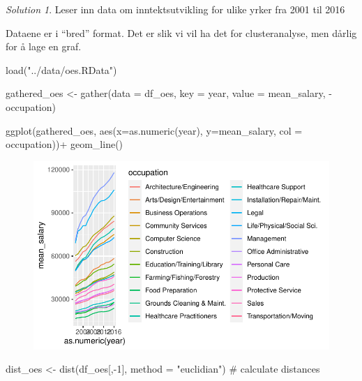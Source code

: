 \documentclass[
  letterpaper,
  DIV=11,
  numbers=noendperiod]{scrreprt}
\newenvironment{Shaded}{\begin{snugshade}}{\end{snugshade}}
\newcommand{\AttributeTok}[1]{\textcolor[rgb]{0.40,0.45,0.13}{#1}}
\newcommand{\CommentTok}[1]{\textcolor[rgb]{0.37,0.37,0.37}{#1}}
\newcommand{\DecValTok}[1]{\textcolor[rgb]{0.68,0.00,0.00}{#1}}
\newcommand{\FunctionTok}[1]{\textcolor[rgb]{0.28,0.35,0.67}{#1}}
\newcommand{\NormalTok}[1]{\textcolor[rgb]{0.00,0.23,0.31}{#1}}
\newcommand{\OtherTok}[1]{\textcolor[rgb]{0.00,0.23,0.31}{#1}}
\newcommand{\SpecialCharTok}[1]{\textcolor[rgb]{0.37,0.37,0.37}{#1}}
\newcommand{\StringTok}[1]{\textcolor[rgb]{0.13,0.47,0.30}{#1}}
\theoremstyle{definition}
\theoremstyle{remark}
\newtheorem*{solution}{Solution}
\begin{document}
\begin{solution}

Leser inn data om inntektsutvikling for ulike yrker fra 2001 til 2016

Dataene er i ``bred'' format. Det er slik vi vil ha det for
clusteranalyse, men dårlig for å lage en graf.

\begin{Shaded}
\begin{Highlighting}[]
\FunctionTok{load}\NormalTok{(}\StringTok{"../data/oes.RData"}\NormalTok{)}

\NormalTok{gathered\_oes }\OtherTok{\textless{}{-}} \FunctionTok{gather}\NormalTok{(}\AttributeTok{data =}\NormalTok{ df\_oes, }
                       \AttributeTok{key =}\NormalTok{ year, }
                       \AttributeTok{value =}\NormalTok{ mean\_salary, }
                       \SpecialCharTok{{-}}\NormalTok{occupation)}

\FunctionTok{ggplot}\NormalTok{(gathered\_oes, }\FunctionTok{aes}\NormalTok{(}\AttributeTok{x=}\FunctionTok{as.numeric}\NormalTok{(year), }\AttributeTok{y=}\NormalTok{mean\_salary, }\AttributeTok{col =}\NormalTok{ occupation))}\SpecialCharTok{+}
  \FunctionTok{geom\_line}\NormalTok{()}
\end{Highlighting}
\end{Shaded}

\begin{figure}[H]

{\centering \includegraphics{./unsupervised_files/figure-pdf/unnamed-chunk-2-1.pdf}

}

\end{figure}

\begin{Shaded}
\begin{Highlighting}[]
\NormalTok{dist\_oes }\OtherTok{\textless{}{-}} \FunctionTok{dist}\NormalTok{(df\_oes[,}\SpecialCharTok{{-}}\DecValTok{1}\NormalTok{], }\AttributeTok{method =} \StringTok{"euclidian"}\NormalTok{) }\CommentTok{\# calculate distances }


\end{Highlighting}
\end{Shaded}
\end{solution}
\end{document}
